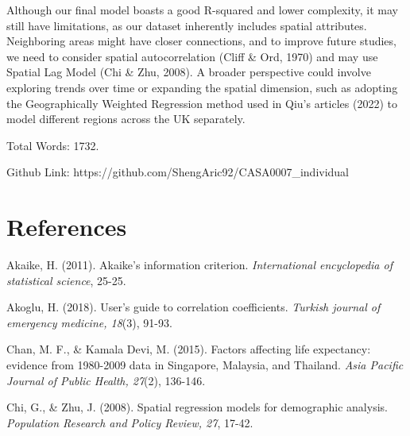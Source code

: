 \documentclass[a4paper,12pt]{article}
\begin{document}
Although our final model boasts a good R-squared and lower complexity, it may still have limitations, as our dataset inherently includes spatial attributes. Neighboring areas might have closer connections, and to improve future studies, we need to consider spatial autocorrelation (Cliff \& Ord, 1970) and may use Spatial Lag Model (Chi \& Zhu, 2008). A broader perspective could involve exploring trends over time or expanding the spatial dimension, such as adopting the Geographically Weighted Regression method used in Qiu's articles (2022) to model different regions across the UK separately.

Total Words: 1732.

Github Link: https://github.com/ShengAric92/CASA0007\_individual
























\clearpage





\clearpage
\section*{References}
\begin{flushleft}
Akaike, H. (2011). Akaike’s information criterion. \textit{International encyclopedia of statistical science}, 25-25.
\end{flushleft}

\begin{flushleft}
Akoglu, H. (2018). User's guide to correlation coefficients. \textit{Turkish journal of emergency medicine, 18}(3), 91-93.
\end{flushleft}

\begin{flushleft}
Chan, M. F., \& Kamala Devi, M. (2015). Factors affecting life expectancy: evidence from 1980-2009 data in Singapore, Malaysia, and Thailand. \textit{Asia Pacific Journal of Public Health, 27}(2), 136-146.
\end{flushleft}

\begin{flushleft}
Chi, G., \& Zhu, J. (2008). Spatial regression models for demographic analysis. \textit{Population Research and Policy Review, 27}, 17-42.
\end{flushleft}
\end{document}
